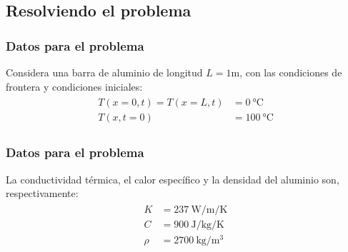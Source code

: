 \documentclass[12pt]{beamer}
\begin{document}
\subsection{Resolviendo el problema}
\begin{frame}
\frametitle{Datos para el problema}
Considera una barra de aluminio de longitud $L = 1 \si\meter$, con las condiciones de frontera y condiciones iniciales:
\begin{align}
\begin{aligned}
T(x = 0, t) = T(x = L, t) &= \SI{0}{\degreeCelsius} \\
T(x, t = 0) &= \SI{100}{\degreeCelsius}
\end{aligned}
\label{eq:ecuacion_17_77}
\end{align}
\end{frame}
\begin{frame}[fragile]
\frametitle{Datos para el problema}
La conductividad térmica, el calor específico y la densidad del aluminio son, respectivamente:
\begin{align}
\begin{aligned}
K &= 237 \: \si{\watt\per\meter\per\kelvin} \\
C &= 900 \: \si{\joule\per\kilogram\per\kelvin} \\
\rho &= 2700 \: \si{\kilogram\per\cubic\metre}
\end{aligned}
\label{eq:ecuacion_17_78}
\end{align}
\end{frame}
\end{document}

